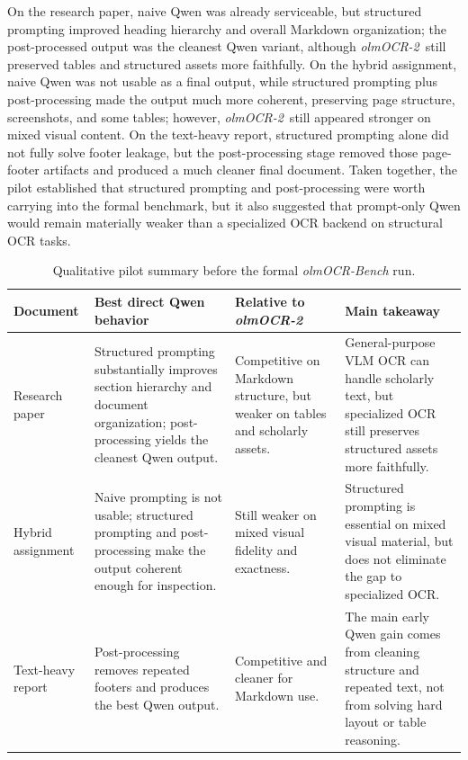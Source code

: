 \documentclass[conference]{IEEEtran}
\newcommand{\papername}[1]{\textit{#1}}
\newcommand{\olmocr}{\papername{olmOCR-2}}
\begin{document}
On the research paper, naive Qwen was already serviceable, but structured prompting improved heading hierarchy and overall Markdown organization; the post-processed output was the cleanest Qwen variant, although \olmocr\ still preserved tables and structured assets more faithfully. On the hybrid assignment, naive Qwen was not usable as a final output, while structured prompting plus post-processing made the output much more coherent, preserving page structure, screenshots, and some tables; however, \olmocr\ still appeared stronger on mixed visual content. On the text-heavy report, structured prompting alone did not fully solve footer leakage, but the post-processing stage removed those page-footer artifacts and produced a much cleaner final document. Taken together, the pilot established that structured prompting and post-processing were worth carrying into the formal benchmark, but it also suggested that prompt-only Qwen would remain materially weaker than a specialized OCR backend on structural OCR tasks.

\begin{table}[t]
\caption{Qualitative pilot summary before the formal \papername{olmOCR-Bench} run.}
\label{tab:pilot-summary}
\centering
\begin{tabular}{p{2.6cm}p{3.6cm}p{3.7cm}p{4.1cm}}
\toprule
Document & Best direct Qwen behavior & Relative to \olmocr & Main takeaway \\
\midrule
Research paper & Structured prompting substantially improves section hierarchy and document organization; post-processing yields the cleanest Qwen output. & Competitive on Markdown structure, but weaker on tables and scholarly assets. & General-purpose VLM OCR can handle scholarly text, but specialized OCR still preserves structured assets more faithfully. \\
Hybrid assignment & Naive prompting is not usable; structured prompting and post-processing make the output coherent enough for inspection. & Still weaker on mixed visual fidelity and exactness. & Structured prompting is essential on mixed visual material, but does not eliminate the gap to specialized OCR. \\
Text-heavy report & Post-processing removes repeated footers and produces the best Qwen output. & Competitive and cleaner for Markdown use. & The main early Qwen gain comes from cleaning structure and repeated text, not from solving hard layout or table reasoning. \\
\bottomrule
\end{tabular}
\end{table}
\end{document}

